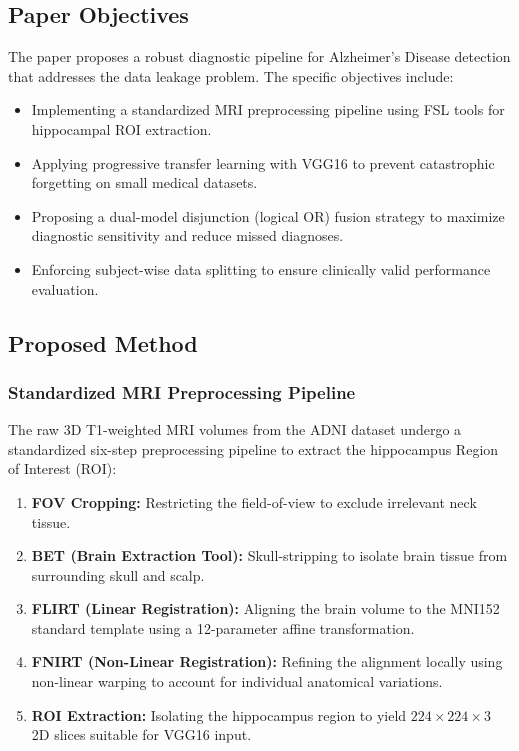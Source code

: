 \subsection{Paper Objectives}
The paper proposes a robust diagnostic pipeline for Alzheimer's Disease detection that addresses the data leakage problem. The specific objectives include:
\begin{itemize}
    \item Implementing a standardized MRI preprocessing pipeline using FSL tools for hippocampal ROI extraction.
    \item Applying progressive transfer learning with VGG16 to prevent catastrophic forgetting on small medical datasets.
    \item Proposing a dual-model disjunction (logical OR) fusion strategy to maximize diagnostic sensitivity and reduce missed diagnoses.
    \item Enforcing subject-wise data splitting to ensure clinically valid performance evaluation.
\end{itemize}

\subsection{Proposed Method}

\subsubsection{Standardized MRI Preprocessing Pipeline}
The raw 3D T1-weighted MRI volumes from the ADNI dataset undergo a standardized six-step preprocessing pipeline to extract the hippocampus Region of Interest (ROI):
\begin{enumerate}
    \item \textbf{FOV Cropping:} Restricting the field-of-view to exclude irrelevant neck tissue.
    \item \textbf{BET (Brain Extraction Tool):} Skull-stripping to isolate brain tissue from surrounding skull and scalp.
    \item \textbf{FLIRT (Linear Registration):} Aligning the brain volume to the MNI152 standard template using a 12-parameter affine transformation.
    \item \textbf{FNIRT (Non-Linear Registration):} Refining the alignment locally using non-linear warping to account for individual anatomical variations.
    \item \textbf{ROI Extraction:} Isolating the hippocampus region to yield $224 \times 224 \times 3$ 2D slices suitable for VGG16 input.
\end{enumerate}

